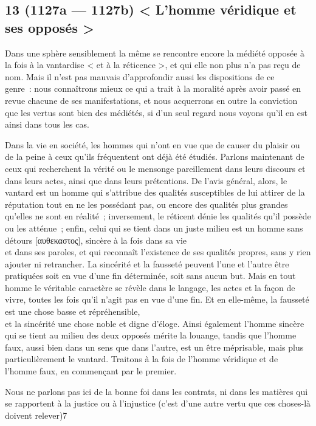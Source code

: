 \documentclass[french,twoside]{book} %
\begin{document}
\subsection[{13 (1127a — 1127b) < L’homme véridique et ses opposés >}]{13 (1127a — 1127b) < L’homme véridique et ses opposés >}
\noindent Dans une sphère sensiblement la même se rencontre encore la médiété opposée à la fois à la vantardise < et à la réticence >, et qui elle non plus n’a pas reçu de nom. Mais il n’est pas mauvais d’approfondir aussi les dispositions de ce \\
genre : nous connaîtrons mieux ce qui a trait à la moralité après avoir passé en revue chacune de ses manifestations, et nous acquerrons en outre la conviction que les vertus sont bien des médiétés, si d’un seul regard nous voyons qu’il en est ainsi dans tous les cas.\par
Dans la vie en société, les hommes qui n’ont en vue que de causer du plaisir ou de la peine à ceux qu’ils fréquentent ont déjà été étudiés. Parlons maintenant de ceux qui recherchent la vérité ou le mensonge pareillement dans leurs discours et \\
dans leurs actes, ainsi que dans leurs prétentions. De l’avis général, alors, le vantard est un homme qui s’attribue des qualités susceptibles de lui attirer de la réputation tout en ne les possédant pas, ou encore des qualités plus grandes qu’elles ne sont en réalité ; inversement, le réticent dénie les qualités qu’il possède ou les atténue ; enfin, celui qui se tient dans un juste milieu est un homme sans détours [αυθεκαστος], sincère à la fois dans sa vie \\
et dans ses paroles, et qui reconnaît l’existence de ses qualités propres, sans y rien ajouter ni retrancher. La sincérité et la fausseté peuvent l’une et l’autre être pratiquées soit en vue d’une fin déterminée, soit sans aucun but. Mais en tout homme le véritable caractère se révèle dans le langage, les actes et la façon de vivre, toutes les fois qu’il n’agit pas en vue d’une fin. Et en elle-même, la fausseté est une chose basse et répréhensible, \\
et la sincérité une chose noble et digne d’éloge. Ainsi également l’homme sincère qui se tient au milieu des deux opposés mérite la louange, tandis que l’homme faux, aussi bien dans un sens que dans l’autre, est un être méprisable, mais plus particulièrement le vantard. Traitons à la fois de l’homme véridique et de l’homme faux, en commençant par le premier.\par
Nous ne parlons pas ici de la bonne foi dans les contrats, ni dans les matières qui se rapportent à la justice ou à l’injustice  (c’est d’une autre vertu que ces choses-là doivent relever)7\\
\end{document}
